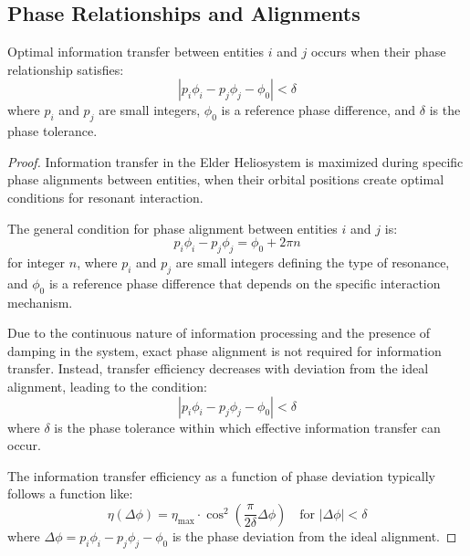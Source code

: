 \subsection{Phase Relationships and Alignments}

\begin{theorem}
Optimal information transfer between entities $i$ and $j$ occurs when their phase relationship satisfies:
\begin{equation}
\left|p_i\phi_i - p_j\phi_j - \phi_0\right| < \delta
\end{equation}
where $p_i$ and $p_j$ are small integers, $\phi_0$ is a reference phase difference, and $\delta$ is the phase tolerance.
\end{theorem}

\begin{proof}
Information transfer in the Elder Heliosystem is maximized during specific phase alignments between entities, when their orbital positions create optimal conditions for resonant interaction.

The general condition for phase alignment between entities $i$ and $j$ is:
\begin{equation}
p_i\phi_i - p_j\phi_j = \phi_0 + 2\pi n
\end{equation}
for integer $n$, where $p_i$ and $p_j$ are small integers defining the type of resonance, and $\phi_0$ is a reference phase difference that depends on the specific interaction mechanism.

Due to the continuous nature of information processing and the presence of damping in the system, exact phase alignment is not required for information transfer. Instead, transfer efficiency decreases with deviation from the ideal alignment, leading to the condition:
\begin{equation}
\left|p_i\phi_i - p_j\phi_j - \phi_0\right| < \delta
\end{equation}
where $\delta$ is the phase tolerance within which effective information transfer can occur.

The information transfer efficiency as a function of phase deviation typically follows a function like:
\begin{equation}
\eta(\Delta\phi) = \eta_{\max} \cdot \cos^2\left(\frac{\pi}{2\delta}\Delta\phi\right) \quad \text{for } |\Delta\phi| < \delta
\end{equation}
where $\Delta\phi = p_i\phi_i - p_j\phi_j - \phi_0$ is the phase deviation from the ideal alignment.


\end{proof}
